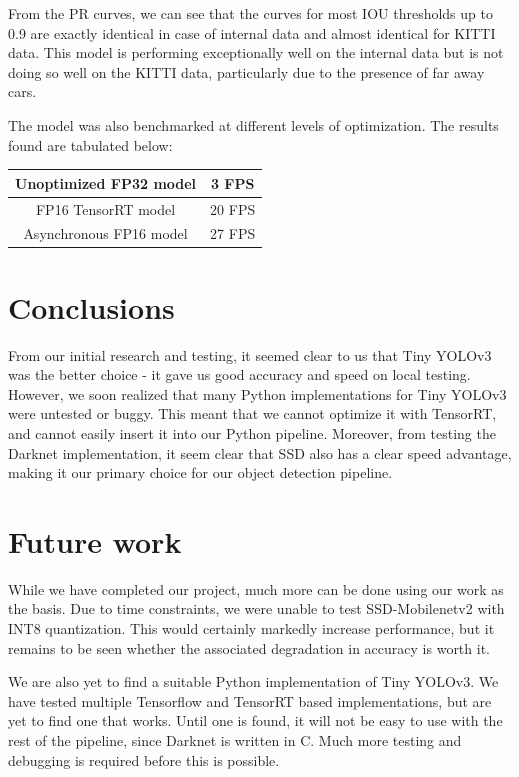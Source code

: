\documentclass[12pt,letterpaper]{article}
\begin{document}
From the PR curves, we can see that the curves for most IOU thresholds up to 0.9 are exactly identical in case of internal data and almost identical for KITTI data. This model is performing exceptionally well on the internal data but is not doing so well on the KITTI data, particularly due to the presence of far away cars. 

The model was also benchmarked at different levels of optimization. The results found are tabulated below:

\begin{center}
\begin{tabular}{|c|c|}
    \hline
    Unoptimized FP32 model & 3 FPS \\
    \hline
    FP16 TensorRT model & 20 FPS \\
    \hline
    Asynchronous FP16 model & 27 FPS \\
    \hline
\end{tabular}
\end{center}

\section{Conclusions}

From our initial research and testing, it seemed clear to us that Tiny YOLOv3 was the better choice - it gave us good accuracy and speed on local testing. However, we soon realized that many Python implementations for Tiny YOLOv3 were untested or buggy. This meant that we cannot optimize it with TensorRT, and cannot easily insert it into our Python pipeline. Moreover, from testing the Darknet implementation, it seem clear that SSD also has a clear speed advantage, making it our primary choice for our object detection pipeline.


\section{Future work}

While we have completed our project, much more can be done using our work as the basis. Due to time constraints, we were unable to test SSD-Mobilenetv2 with INT8 quantization. This would certainly markedly increase performance, but it remains to be seen whether the associated degradation in accuracy is worth it.

We are also yet to find a suitable Python implementation of Tiny YOLOv3. We have tested multiple Tensorflow and TensorRT based implementations, but are yet to find one that works. Until one is found, it will not be easy to use with the rest of the pipeline, since Darknet is written in C. Much more testing and debugging is required before this is possible.
\end{document}
